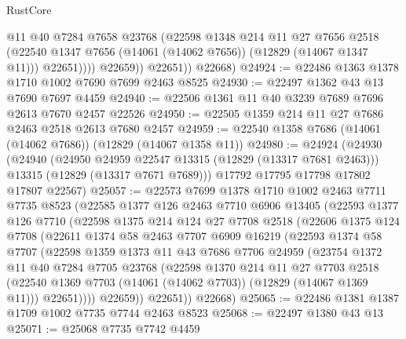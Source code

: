 \begin{lexlean}{RustCore}
\begin{coremodule}
                    @11
                    @40
                    @7284
                    @7658
                    @23768
                    (@22598
                      @1348
                      @214
                      @11
                      @27
                      @7656
                      @2518
                      (@22540 @1347 @7656 (@14061 (@14062 @7656)) (@12829 (@14067 @1347 @11)))
                      @22651))))
              @22659))
          @22651))
      @22668)
@24924 := @22486 @1363 @1378 @1710 @1002 @7690 @7699 @2463 @8525
@24930 := @22497 @1362 @43 @13 @7690 @7697 @4459
@24940 := @22506 @1361 @11 @40 @3239 @7689 @7696 @2613 @7670 @2457 @22526
@24950 := @22505 @1359 @214 @11 @27 @7686 @2463 @2518 @2613 @7680 @2457
@24959 := @22540 @1358 @7686 (@14061 (@14062 @7686)) (@12829 (@14067 @1358 @11))
@24980 := @24924
    (@24930
      (@24940
        (@24950 @24959 @22547 @13315 (@12829 (@13317 @7681 @2463)))
        @13315
        (@12829 (@13317 @7671 @7689)))
      @17792
      @17795
      @17798
      @17802
      @17807
      @22567)
@25057 := @22573
    @7699
    @1378
    @1710
    @1002
    @2463
    @7711
    @7735
    @8523
    (@22585
      @1377
      @126
      @2463
      @7710
      @6906
      @13405
      (@22593
        @1377
        @126
        @7710
        (@22598
          @1375
          @214
          @124
          @27
          @7708
          @2518
          (@22606
            @1375
            @124
            @7708
            (@22611
              @1374
              @58
              @2463
              @7707
              @6909
              @16219
              (@22593
                @1374
                @58
                @7707
                (@22598
                  @1359
                  @1373
                  @11
                  @43
                  @7686
                  @7706
                  @24959
                  (@23754
                    @1372
                    @11
                    @40
                    @7284
                    @7705
                    @23768
                    (@22598
                      @1370
                      @214
                      @11
                      @27
                      @7703
                      @2518
                      (@22540 @1369 @7703 (@14061 (@14062 @7703)) (@12829 (@14067 @1369 @11)))
                      @22651))))
              @22659))
          @22651))
      @22668)
@25065 := @22486 @1381 @1387 @1709 @1002 @7735 @7744 @2463 @8523
@25068 := @22497 @1380 @43 @13
@25071 := @25068 @7735 @7742 @4459

\end{coremodule}
\end{lexlean}
